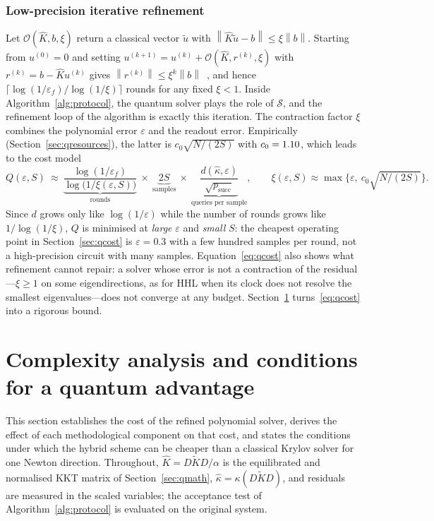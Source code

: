 \documentclass[11pt]{article}
\theoremstyle{definition}
\newcommand{\norm}[1]{\left\lVert #1 \right\rVert}
\newcommand{\Kt}{\tilde K}
\newcommand{\Kh}{\hat K}
\newcommand{\kh}{\hat\kappa}
\newcommand{\eps}{\varepsilon}
\begin{document}
\subsubsection{Low-precision iterative refinement}\label{sec:refine}
Let $\mathcal O(\Kh,b,\xi)$ return a classical vector $\tilde u$ with $\norm{\Kh\tilde u-b}\le\xi\norm{b}$. Starting from $u^{(0)}=0$ and setting $u^{(k+1)}=u^{(k)}+\mathcal O(\Kh,r^{(k)},\xi)$ with $r^{(k)}=b-\Kh u^{(k)}$ gives $\norm{r^{(k)}}\le\xi^k\norm{b}$~\cite[Thm.~4.1]{harkness2026ir}, and hence $\lceil\log(1/\eps_f)/\log(1/\xi)\rceil$ rounds for any fixed $\xi<1$. Inside Algorithm~\ref{alg:protocol}, the quantum solver plays the role of $\mathcal S$, and the refinement loop of the algorithm is exactly this iteration. The contraction factor $\xi$ combines the polynomial error $\eps$ and the readout error. Empirically (Section~\ref{sec:qresources}), the latter is $c_0\sqrt{N/(2S)}$ with $c_0=1.10$, which leads to the cost model
\begin{equation}\label{eq:qcost}
Q(\eps,S)\ \approx\ \underbrace{\frac{\log(1/\eps_f)}{\log\big(1/\xi(\eps,S)\big)}}_{\text{rounds}}\ \times\ \underbrace{2S}_{\text{samples}}\ \times\ \underbrace{\frac{d(\kh,\eps)}{\sqrt{p_{\text{succ}}}}}_{\text{queries per sample}},\qquad \xi(\eps,S)\approx\max\Big\{\eps,\ c_0\sqrt{N/(2S)}\Big\}.
\end{equation}
Since $d$ grows only like $\log(1/\eps)$ while the number of rounds grows like $1/\log(1/\xi)$, $Q$ is minimised at \emph{large} $\eps$ and \emph{small} $S$: the cheapest operating point in Section~\ref{sec:qcost} is $\eps=0.3$ with a few hundred samples per round, not a high-precision circuit with many samples. Equation~\eqref{eq:qcost} also shows what refinement cannot repair: a solver whose error is not a contraction of the residual---$\xi\ge1$ on some eigendirections, as for HHL when its clock does not resolve the smallest eigenvalues---does not converge at any budget. Section~\ref{sec:theory} turns~\eqref{eq:qcost} into a rigorous bound.

\section{Complexity analysis and conditions for a quantum advantage}\label{sec:theory}
This section establishes the cost of the refined polynomial solver, derives the effect of each methodological component on that cost, and states the conditions under which the hybrid scheme can be cheaper than a classical Krylov solver for one Newton direction. Throughout, $\Kh=D\Kt D/\alpha$ is the equilibrated and normalised KKT matrix of Section~\ref{sec:qmath}, $\kh=\kappa(D\Kt D)$, and residuals are measured in the scaled variables; the acceptance test of Algorithm~\ref{alg:protocol} is evaluated on the original system.
\end{document}
